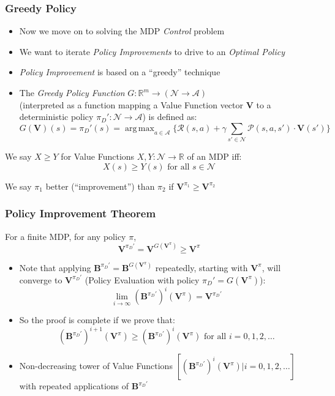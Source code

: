 \documentclass[handout]{beamer}
\DeclareMathOperator*{\argmax}{arg\,max}
\newcommand{\bvpi}{\bm{V}^{\pi}}
\newcommand{\bv}{\bm{V}}
\begin{document}
\begin{frame}
\frametitle{Greedy Policy}
\pause
\begin{itemize}[<+->]
\item Now we move on to solving the MDP {\em Control} problem
\item We want to iterate {\em Policy Improvements} to drive to an {\em Optimal Policy}
\item {\em Policy Improvement} is based on a ``greedy'' technique
\item The {\em Greedy Policy Function} $G: \mathbb{R}^m \rightarrow (\mathcal{N} \rightarrow \mathcal{A})$\\
(interpreted as a function mapping a Value Function vector $\bv$ to a deterministic policy $\pi_D': \mathcal{N} \rightarrow \mathcal{A}$) is defined as:
$$G(\bv)(s) = \pi_D'(s) = \argmax_{a\in \mathcal{A}} \{\mathcal{R}(s,a) + \gamma \sum_{s' \in \mathcal{N}} \mathcal{P}(s,a,s') \cdot \bv(s') \}$$
\end{itemize}
\pause
\begin{definition}
We say $X \geq Y$ for Value Functions $X, Y: \mathcal{N} \rightarrow \mathbb{R}$ of an MDP iff:
$$X(s) \geq Y(s) \text{ for all } s \in \mathcal{N}$$
\end{definition}
\pause
We say $\pi_1$ better (``improvement'') than $\pi_2$ if $\bm{V}^{\pi_1} \geq \bm{V}^{\pi_2}$
\end{frame}

\begin{frame}
\frametitle{Policy Improvement Theorem}
\begin{theorem}
For a finite MDP, for any policy $\pi$,
$$\bm{V}^{\pi_D'} = \bm{V}^{G(\bvpi)} \geq \bvpi$$
\label{th:policy_improvement_theorem}
\end{theorem}
\pause
\begin{itemize}[<+->]
\item Note that applying $\bm{B}^{\pi_D'} = \bm{B}^{G(\bvpi)}$ repeatedly, starting with $\bvpi$, will converge to $\bm{V}^{\pi_D'}$ (Policy Evaluation with policy $\pi_D' = G(\bvpi)$):
$$\lim_{i\rightarrow \infty} (\bm{B}^{\pi_D'})^i(\bvpi) = \bm{V}^{\pi_D'}$$
\item So the proof is complete if we prove that:
$$(\bm{B}^{\pi_D'})^{i+1}(\bvpi) \geq (\bm{B}^{\pi_D'})^i(\bvpi) \text{ for all } i = 0, 1, 2, \ldots$$
\item Non-decreasing tower of Value Functions $[(\bm{B}^{\pi_D'})^i(\bvpi)|i = 0, 1, 2, \ldots]$ with repeated applications of $\bm{B}^{\pi_D'}$
\end{itemize}
\end{frame}
\end{document}
